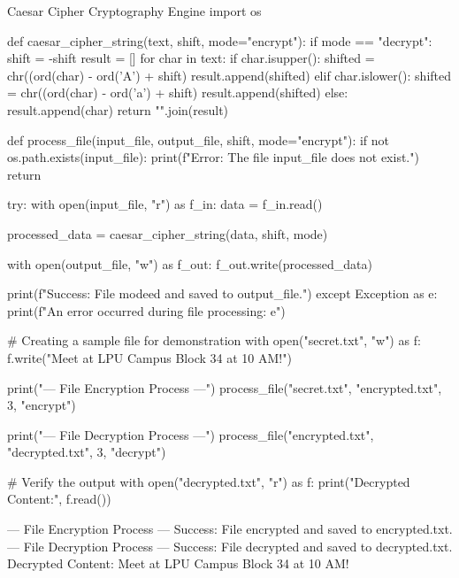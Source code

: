 \begin{pythoncode}{Caesar Cipher Cryptography Engine}
import os

def caesar_cipher_string(text, shift, mode="encrypt"):
    if mode == "decrypt":
        shift = -shift
    result = []
    for char in text:
        if char.isupper():
            shifted = chr((ord(char) - ord('A') + shift) %
            result.append(shifted)
        elif char.islower():
            shifted = chr((ord(char) - ord('a') + shift) %
            result.append(shifted)
        else:
            result.append(char)
    return "".join(result)

def process_file(input_file, output_file, shift, mode="encrypt"):
    if not os.path.exists(input_file):
        print(f"Error: The file {input_file} does not exist.")
        return
        
    try:
        with open(input_file, "r") as f_in:
            data = f_in.read()
            
        processed_data = caesar_cipher_string(data, shift, mode)
        
        with open(output_file, "w") as f_out:
            f_out.write(processed_data)
            
        print(f"Success: File {mode}ed and saved to {output_file}.")
    except Exception as e:
        print(f"An error occurred during file processing: {e}")

# Creating a sample file for demonstration
with open("secret.txt", "w") as f:
    f.write("Meet at LPU Campus Block 34 at 10 AM!")

print("--- File Encryption Process ---")
process_file("secret.txt", "encrypted.txt", 3, "encrypt")

print("--- File Decryption Process ---")
process_file("encrypted.txt", "decrypted.txt", 3, "decrypt")

# Verify the output
with open("decrypted.txt", "r") as f:
    print("Decrypted Content:", f.read())
\end{pythoncode}

\begin{outputbox}
--- File Encryption Process ---
Success: File encrypted and saved to encrypted.txt.
--- File Decryption Process ---
Success: File decrypted and saved to decrypted.txt.
Decrypted Content: Meet at LPU Campus Block 34 at 10 AM!
\end{outputbox}

